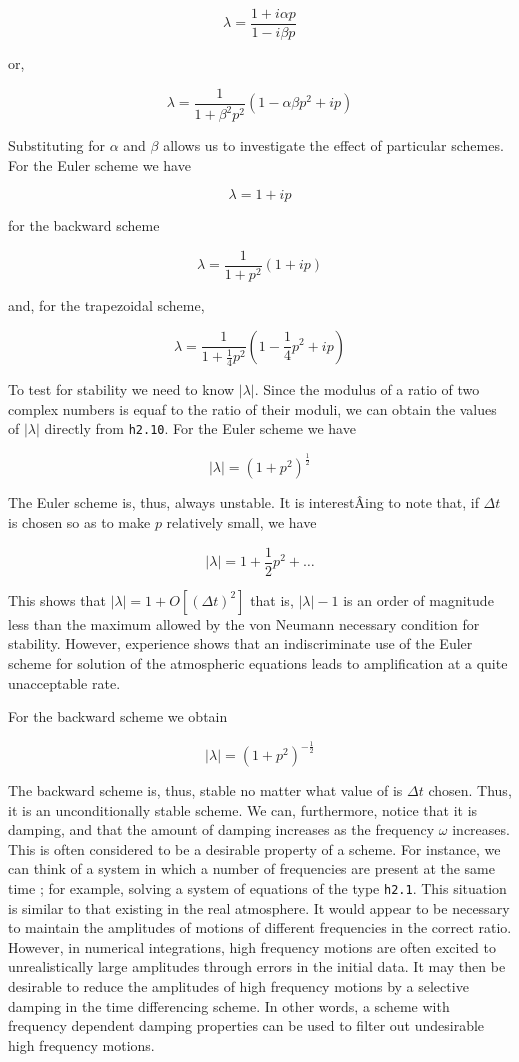 {\[\lambda = \frac{1 + i\alpha p}{1 - i\beta p}\]}

or,

\[\lambda = \frac{1}{1 + \beta^2 p^2}( 1 - \alpha\beta p^{2} + ip )\]

Substituting for \(\alpha\) and \(\beta\) allows us to investigate the
effect of particular schemes. For the Euler scheme we have

{\[\lambda = 1 + ip\]}

for the backward scheme

{\[\lambda = \frac{1}{1 + p^{2}}\left( 1 + ip \right)\]}

and, for the trapezoidal scheme,

{\[\lambda = \frac{1}{1 + \frac{1}{4}p^{2}}\left( 1 - \frac{1}{4}p^{2} + ip \right)\]}

To test for stability we need to know \(| \lambda |\). Since the modulus
of a ratio of two complex numbers is equaf to the ratio of their moduli,
we can obtain the values of \(| \lambda |\) directly from
\texttt{h2.10}. For the Euler scheme we have

{\[| \lambda | = \left( 1 + p^{2} \right)^{\frac{1}{2}}\]}

The Euler scheme is, thus, always unstable. It is interestÂ­ing to note
that, if \(\Delta t\) is chosen so as to make \(p\) relatively small, we
have

{\[| \lambda | = 1 + \frac{1}{2}p^{2} + \ldots\]}

This shows that
\(| \lambda | = 1 + O\left\lbrack \left( \Delta t \right)^{2} \right\rbrack\)
that is, \(| \lambda | - 1\) is an order of magnitude less than the
maximum allowed by the von Neumann necessary condition for stability.
However, experience shows that an indiscriminate use of the Euler scheme
for solution of the atmospheric equations leads to amplification at a
quite unacceptable rate.

For the backward scheme we obtain

{\[| \lambda |  = \left( 1 + p^{2} \right)^{-\frac{ 1}{2}}\]}

The backward scheme is, thus, stable no matter what value of is
\(\Delta t\) chosen. Thus, it is an unconditionally stable scheme. We
can, furthermore, notice that it is damping, and that the amount of
damping increases as the frequency \(\omega\) increases. This is often
considered to be a desirable property of a scheme. For instance, we can
think of a system in which a number of frequencies are present at the
same time ; for example, solving a system of equations of the type
\texttt{h2.1}. This situation is similar to that existing in the real
atmosphere. It would appear to be necessary to maintain the amplitudes
of motions of different frequencies in the correct ratio. However, in
numerical integrations, high frequency motions are often excited to
unrealistically large amplitudes through errors in the initial data. It
may then be desirable to reduce the amplitudes of high frequency motions
by a selective damping in the time differencing scheme. In other words,
a scheme with frequency dependent damping properties can be used to
filter out undesirable high frequency motions.

